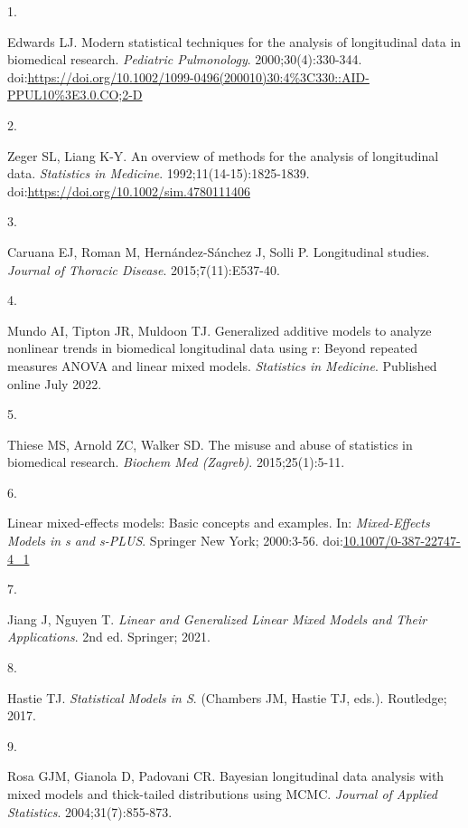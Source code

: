 \documentclass[
]{article}
\newlength{\cslhangindent}
\newlength{\csllabelwidth}
\newlength{\cslentryspacingunit} %
\newenvironment{CSLReferences}[2] %
 {%
  \setlength{\parindent}{0pt}
  \ifodd #1
  \let\oldpar\par
  \def\par{\hangindent=\cslhangindent\oldpar}
  \fi
  \setlength{\parskip}{#2\cslentryspacingunit}
 }%
 {}
\newcommand{\CSLLeftMargin}[1]{\parbox[t]{\csllabelwidth}{#1}}
\newcommand{\CSLRightInline}[1]{\parbox[t]{\linewidth - \csllabelwidth}{#1}\break}
\begin{document}
\hypertarget{refs}{}
\begin{CSLReferences}{0}{0}
\leavevmode{}%
\CSLLeftMargin{1. }%
\CSLRightInline{Edwards LJ. Modern statistical techniques for the
analysis of longitudinal data in biomedical research. \emph{Pediatric
Pulmonology}. 2000;30(4):330-344.
doi:\url{https://doi.org/10.1002/1099-0496(200010)30:4\%3C330::AID-PPUL10\%3E3.0.CO;2-D}}

\leavevmode{}%
\CSLLeftMargin{2. }%
\CSLRightInline{Zeger SL, Liang K-Y. An overview of methods for the
analysis of longitudinal data. \emph{Statistics in Medicine}.
1992;11(14-15):1825-1839.
doi:\url{https://doi.org/10.1002/sim.4780111406}}

\leavevmode{}%
\CSLLeftMargin{3. }%
\CSLRightInline{Caruana EJ, Roman M, Hernández-Sánchez J, Solli P.
Longitudinal studies. \emph{Journal of Thoracic Disease}.
2015;7(11):E537-40.}

\leavevmode{}%
\CSLLeftMargin{4. }%
\CSLRightInline{Mundo AI, Tipton JR, Muldoon TJ. Generalized additive
models to analyze nonlinear trends in biomedical longitudinal data using
r: Beyond repeated measures {ANOVA} and linear mixed models.
\emph{Statistics in Medicine}. Published online July 2022.}

\leavevmode{}%
\CSLLeftMargin{5. }%
\CSLRightInline{Thiese MS, Arnold ZC, Walker SD. The misuse and abuse of
statistics in biomedical research. \emph{Biochem Med (Zagreb)}.
2015;25(1):5-11.}

\leavevmode{}%
\CSLLeftMargin{6. }%
\CSLRightInline{Linear mixed-effects models: Basic concepts and
examples. In: \emph{Mixed-Effects Models in s and s-PLUS}. Springer New
York; 2000:3-56.
doi:\href{https://doi.org/10.1007/0-387-22747-4_1}{10.1007/0-387-22747-4\_1}}

\leavevmode{}%
\CSLLeftMargin{7. }%
\CSLRightInline{Jiang J, Nguyen T. \emph{Linear and Generalized Linear
Mixed Models and Their Applications}. 2nd ed. Springer; 2021.}

\leavevmode{}%
\CSLLeftMargin{8. }%
\CSLRightInline{Hastie TJ. \emph{Statistical Models in {S}}. (Chambers
JM, Hastie TJ, eds.). Routledge; 2017.}

\leavevmode{}%
\CSLLeftMargin{9. }%
\CSLRightInline{Rosa GJM, Gianola D, Padovani CR. Bayesian longitudinal
data analysis with mixed models and thick-tailed distributions using
{MCMC}. \emph{Journal of Applied Statistics}. 2004;31(7):855-873.}


\end{CSLReferences}
\end{document}
